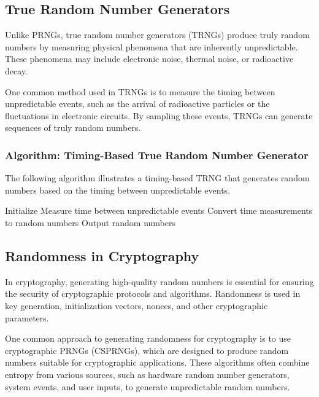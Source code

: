 \documentclass[12pt]{book} %
\begin{document}
\subsection{True Random Number Generators}

Unlike PRNGs, true random number generators (TRNGs) produce truly random numbers by measuring physical phenomena that are inherently unpredictable. These phenomena may include electronic noise, thermal noise, or radioactive decay.

One common method used in TRNGs is to measure the timing between unpredictable events, such as the arrival of radioactive particles or the fluctuations in electronic circuits. By sampling these events, TRNGs can generate sequences of truly random numbers.

\subsubsection{Algorithm: Timing-Based True Random Number Generator}

The following algorithm illustrates a timing-based TRNG that generates random numbers based on the timing between unpredictable events.
\FloatBarrier
\begin{algorithm}
\caption{Timing-Based True Random Number Generator}
\begin{algorithmic}
\State Initialize
    \State Measure time between unpredictable events
    \State Convert time measurements to random numbers
    \State Output random numbers
\EndWhile
\end{algorithmic}
\end{algorithm}
\FloatBarrier

\subsection{Randomness in Cryptography}

In cryptography, generating high-quality random numbers is essential for ensuring the security of cryptographic protocols and algorithms. Randomness is used in key generation, initialization vectors, nonces, and other cryptographic parameters.

One common approach to generating randomness for cryptography is to use cryptographic PRNGs (CSPRNGs), which are designed to produce random numbers suitable for cryptographic applications. These algorithms often combine entropy from various sources, such as hardware random number generators, system events, and user inputs, to generate unpredictable random numbers.
\end{document}
